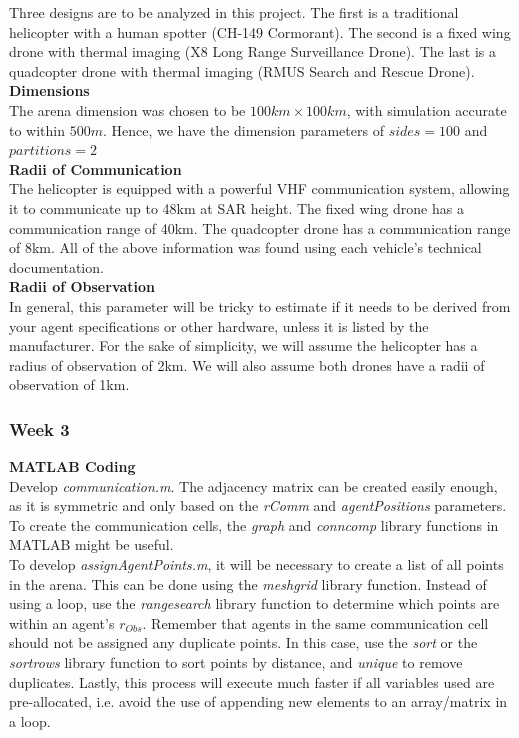 \documentclass[../CourseManual.tex]{subfiles}
\begin{document}
Three designs are to be analyzed in this project. The first is a traditional helicopter with a human spotter (CH-149 Cormorant). The second is a fixed wing drone with thermal imaging (X8 Long Range Surveillance Drone). The last is a quadcopter drone with thermal imaging (RMUS Search and Rescue Drone). \\

\textbf{Dimensions}\\
The arena dimension was chosen to be $100km \times 100km$, with simulation accurate to within $500m$. Hence, we have the dimension parameters of $sides = 100$ and $partitions = 2$ \\

\textbf{Radii of Communication}\\
The helicopter is equipped with a powerful VHF communication system, allowing it to communicate up to 48km at SAR height. The fixed wing drone has a communication range of 40km. The quadcopter drone has a communication range of 8km. All of the above information was found using each vehicle's technical documentation. \\

\textbf{Radii of Observation}\\
In general, this parameter will be tricky to estimate if it needs to be derived from your agent specifications or other hardware, unless it is listed by the manufacturer. For the sake of simplicity, we will assume the helicopter has a radius of observation of 2km. We will also assume both drones have a radii of observation of 1km.

\subsubsection{Week 3}
\textbf{MATLAB Coding}\\
Develop \textit{communication.m}. The adjacency matrix can be created easily enough, as it is symmetric and only based on the \textit{rComm} and \textit{agentPositions} parameters. To create the communication cells, the \textit{graph} and \textit{conncomp} library functions in MATLAB might be useful. \\

To develop \textit{assignAgentPoints.m}, it will be necessary to create a list of all points in the arena. This can be done using the \textit{meshgrid} library function. Instead of using a loop, use the \textit{rangesearch} library function to determine which points are within an agent's \textit{$r_{Obs}$}. Remember that agents in the same communication cell should not be assigned any duplicate points. In this case, use the \textit{sort} or the \textit{sortrows} library function to sort points by distance, and \textit{unique} to remove duplicates. Lastly, this process will execute much faster if all variables used are pre-allocated, i.e. avoid the use of appending new elements to an array/matrix in a loop.
\end{document}

